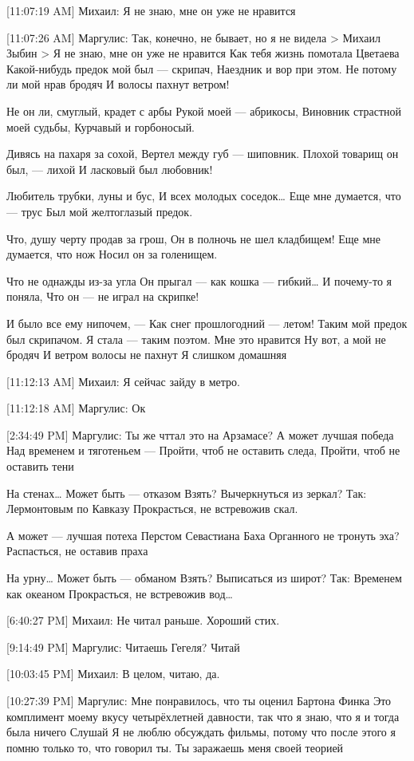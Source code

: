 \documentclass{article}
\begin{document}
{[11:07:19 AM] Михаил:
Я не знаю, мне он уже не нравится

[11:07:26 AM] Маргулис:
Так, конечно, не бывает, но я не видела
> Михаил Зыбин
> Я не знаю, мне он уже не нравится
Как тебя жизнь помотала
 Цветаева
 Какой-нибудь предок мой был — скрипач,
Наездник и вор при этом.
Не потому ли мой нрав бродяч
И волосы пахнут ветром!

Не он ли, смуглый, крадет с арбы
Рукой моей — абрикосы,
Виновник страстной моей судьбы,
Курчавый и горбоносый.

Дивясь на пахаря за сохой,
Вертел между губ — шиповник.
Плохой товарищ он был, — лихой
И ласковый был любовник!

Любитель трубки, луны и бус,
И всех молодых соседок…
Еще мне думается, что — трус
Был мой желтоглазый предок.

Что, душу черту продав за грош,
Он в полночь не шел кладбищем!
Еще мне думается, что нож
Носил он за голенищем.

Что не однажды из-за угла
Он прыгал — как кошка — гибкий…
И почему-то я поняла,
Что он — не играл на скрипке!

И было все ему нипочем, —
Как снег прошлогодний — летом!
Таким мой предок был скрипачом.
Я стала — таким поэтом.
 Мне это нравится
 Ну вот, а мой не бродяч
 И ветром волосы не пахнут
 Я слишком домашняя

[11:12:13 AM] Михаил:
Я сейчас зайду в метро.

[11:12:18 AM] Маргулис:
Ок

[2:34:49 PM] Маргулис:
Ты же чттал это на Арзамасе?
 А может лучшая победа
Над временем и тяготеньем —
Пройти, чтоб не оставить следа,
Пройти, чтоб не оставить тени

На стенах…
                     Может быть — отказом
Взять? Вычеркнуться из зеркал?
Так: Лермонтовым по Кавказу
Прокрасться, не встревожив скал.

А может — лучшая потеха
Перстом Севастиана Баха
Органного не тронуть эха?
Распасться, не оставив праха

На урну…
                 Может быть — обманом
Взять? Выписаться из широт?
Так: Временем как океаном
Прокрасться, не встревожив вод…

[6:40:27 PM] Михаил:
Не читал раньше. Хороший стих.

[9:14:49 PM] Маргулис:
Читаешь Гегеля?
 Читай

[10:03:45 PM] Михаил:
В целом, читаю, да.

[10:27:39 PM] Маргулис:
Мне понравилось, что ты оценил Бартона Финка
 Это комплимент моему вкусу четырёхлетней давности, так что я знаю, что я и тогда была ничего
 Слушай
 Я не люблю обсуждать фильмы, потому что после этого я помню только то, что говорил ты. Ты заражаешь меня своей теорией

}
\end{document}

